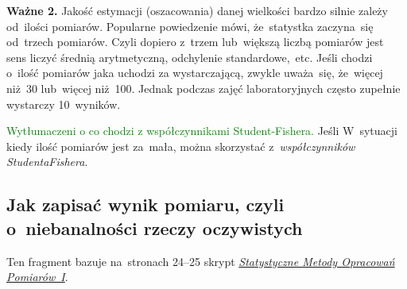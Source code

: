 \documentclass[a4paper,11pt]{article}
\newcommand{\tb}{\textbf}
\newcommand{\toadd}[1]{\textcolor{green}{#1}}
\begin{document}
\tb{Ważne 2.} Jakość estymacji (oszacowania) danej wielkości bardzo
silnie zależy od~ilości pomiarów. Popularne powiedzenie mówi,
że~statystka zaczyna~się od~trzech pomiarów. Czyli dopiero z~trzem
lub~większą liczbą pomiarów jest sens liczyć średnią arytmetyczną,
odchylenie standardowe,~etc. Jeśli chodzi o~ilość pomiarów jaka
uchodzi za wystarczającą, zwykle uważa~się, że~więcej niż~30
lub~więcej niż~100. Jednak podczas zajęć laboratoryjnych często
zupełnie wystarczy 10~wyników.

\toadd{Wytłumaczeni o co chodzi z współczynnikami Student-Fishera.}
Jeśli W~sytuacji kiedy ilość pomiarów jest za~mała, można skorzystać
z~\emph{współczynników Studenta\dywiz Fishera}.





\subsection{Jak zapisać wynik pomiaru, czyli o~niebanalności rzeczy
  oczywistych}

Ten fragment bazuje na~stronach 24--25 skrypt
\href{http://users.uj.edu.pl/\~ufkamys/BK/smop1N\_h.pdf}{\emph{Statystyczne
    Metody Opracowań Pomiarów~I}}.
\end{document}
